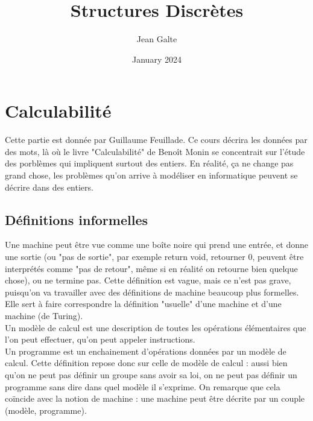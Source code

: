 \documentclass{article}
\title{Structures Discrètes}
\author{Jean Galte}
\date{January 2024}
\begin{document}
\maketitle
\newpage

\section{Calculabilité}

Cette partie est donnée par Guillaume Feuillade. 
Ce cours décrira les données par des mots, là où le livre "Calculabilité" de Benoît Monin se concentrait sur l'étude des porblèmes qui impliquent surtout des entiers. En réalité, ça ne change pas grand chose, les problèmes qu'on arrive à modéliser en informatique peuvent se décrire dans des entiers.

\subsection{Définitions informelles}

Une machine peut être vue comme une boîte noire qui prend une entrée, et donne une sortie (ou "pas de sortie", par exemple return void, retourner 0, peuvent être interprétés comme "pas de retour", même si en réalité on retourne bien quelque chose), ou ne termine pas. Cette définition est vague, mais ce n'est pas grave, puisqu'on va travailler avec des définitions de machine beaucoup plus formelles. Elle sert à faire correspondre la définition "usuelle" d'une machine et d'une machine (de Turing). \\ 

Un modèle de calcul est une description de toutes les opérations élémentaires que l'on peut effectuer, qu'on peut appeler instructions. \\ 

Un programme est un enchainement d'opérations données par un modèle de calcul. Cette définition repose donc sur celle de modèle de calcul : aussi bien qu'on ne peut pas définir un groupe sans avoir sa loi, on ne peut pas définir un programme sans dire dans quel modèle il s'exprime. On remarque que cela coïncide avec la notion de machine : une machine peut être décrite par un couple (modèle, programme). \\ 
\end{document}
